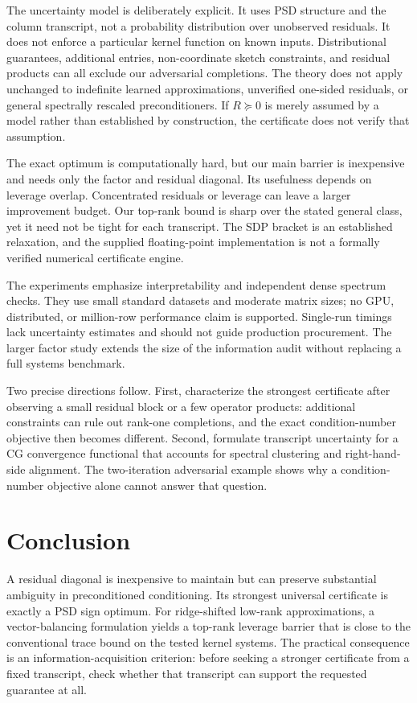 \documentclass[11pt]{article}
\theoremstyle{definition}\newtheorem{definition}[theorem]{Definition}
\begin{document}
The uncertainty model is deliberately explicit. It uses PSD structure and the column transcript, not a probability distribution over unobserved residuals. It does not enforce a particular kernel function on known inputs. Distributional guarantees, additional entries, non-coordinate sketch constraints, and residual products can all exclude our adversarial completions. The theory does not apply unchanged to indefinite learned approximations, unverified one-sided residuals, or general spectrally rescaled preconditioners. If $R\succeq0$ is merely assumed by a model rather than established by construction, the certificate does not verify that assumption.

The exact optimum is computationally hard, but our main barrier is inexpensive and needs only the factor and residual diagonal. Its usefulness depends on leverage overlap. Concentrated residuals or leverage can leave a larger improvement budget. Our top-rank bound is sharp over the stated general class, yet it need not be tight for each transcript. The SDP bracket is an established relaxation, and the supplied floating-point implementation is not a formally verified numerical certificate engine.

The experiments emphasize interpretability and independent dense spectrum checks. They use small standard datasets and moderate matrix sizes; no GPU, distributed, or million-row performance claim is supported. Single-run timings lack uncertainty estimates and should not guide production procurement. The larger factor study extends the size of the information audit without replacing a full systems benchmark.

Two precise directions follow. First, characterize the strongest certificate after observing a small residual block or a few operator products: additional constraints can rule out rank-one completions, and the exact condition-number objective then becomes different. Second, formulate transcript uncertainty for a CG convergence functional that accounts for spectral clustering and right-hand-side alignment. The two-iteration adversarial example shows why a condition-number objective alone cannot answer that question.

\section{Conclusion}
A residual diagonal is inexpensive to maintain but can preserve substantial ambiguity in preconditioned conditioning. Its strongest universal certificate is exactly a PSD sign optimum. For ridge-shifted low-rank approximations, a vector-balancing formulation yields a top-rank leverage barrier that is close to the conventional trace bound on the tested kernel systems. The practical consequence is an information-acquisition criterion: before seeking a stronger certificate from a fixed transcript, check whether that transcript can support the requested guarantee at all.
\end{document}
